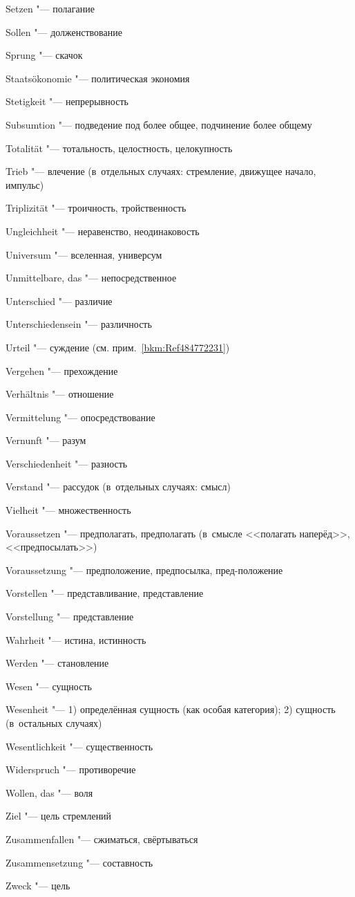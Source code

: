 \begin{multicols}{2}
Setzen "--- полагание

Sollen "--- долженствование

Sprung "--- скачок

Staats\-ökonomie "--- политическая экономия

Stetigkeit "--- непрерывность

Subsumtion "--- подведение под более общее, подчинение более общему

\bigskip

Totalität "--- тотальность, целостность, целокупность

Trieb "--- влечение (в~отдельных случаях: стремление, движущее начало, импульс)

Triplizität "--- троичность, тройственность

\bigskip

Ungleich\-heit "--- неравенство, неодинаковость

Universum "--- вселенная, универсум

Unmittel\-bare, das "--- непосредственное

Unter\-schied "--- различие

Unter\-schie\-densein "--- различность

Urteil "--- суждение (см. прим.~\ref{bkm:Ref484772231})

\bigskip

Vergehen "--- прехождение

Verhältnis "--- отношение

Vermit\-telung "--- опосредствование

Vernunft "--- разум

Ver\-schieden\-heit "--- разность

Verstand "--- рассудок (в~отдельных случаях: смысл)

Vielheit "--- множественность

Voraus\-setzen "--- предполагать, предполагать (в~смысле <<полагать
наперёд>>, <<предпосылать>>)

Voraus\-setzung "--- предположение, предпосылка, пред-положение

Vor\-stellen "--- представливание, представление

Vor\-stellung "--- представление

\bigskip

Wahrheit "--- истина, истинность

Werden "--- становление

Wesen "--- сущность

Wesen\-heit "--- 1) определённая сущность (как особая категория);
2) сущность (в~остальных случаях)

Wesent\-lich\-keit "--- существенность

Widers\-pruch "--- противоречие

Wollen, das "--- воля

\bigskip

Ziel "--- цель стремлений

Zusammen\-fallen "--- сжиматься, свёртываться

Zusammen\-setzung "--- составность

Zweck "--- цель
\end{multicols}


